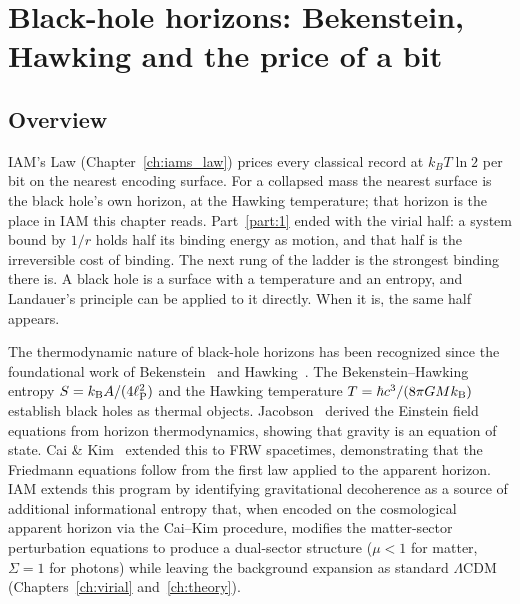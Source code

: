 
\chapter{Black-hole horizons: Bekenstein, Hawking and the price of a bit}\label{ch:blackholes}

\section*{Overview}
IAM's Law (Chapter~\ref{ch:iams_law}) prices every classical record at $k_BT\ln2$ per bit on the nearest encoding surface. For a collapsed
mass the nearest surface is the black hole's own horizon, at the Hawking temperature; that horizon is the place in IAM this chapter reads.
Part~\ref{part:1} ended with the virial half: a system bound by $1/r$ holds half its binding energy as motion, and that half is the irreversible cost of binding. The
next rung of the ladder is the strongest binding there is. A black hole is a surface with a temperature and an entropy, and Landauer's principle can be
applied to it directly. When it is, the same half appears.

The thermodynamic nature of black-hole horizons has been recognized since the foundational work of Bekenstein~\cite{Bekenstein1973} and Hawking~\cite{Hawking1975}. The
Bekenstein--Hawking entropy $S=k_{\mathrm B} A/(4\ell_{\mathrm P}^2)$ and the Hawking temperature $T=\hbar c^3/(8\pi GMk_{\mathrm B})$ establish black holes as thermal objects.
Jacobson~\cite{Jacobson1995} derived the Einstein field equations from horizon thermodynamics, showing that gravity is an equation of state. Cai \& Kim~\cite{CaiKim2005}
extended this to FRW spacetimes, demonstrating that the Friedmann equations follow from the first law applied to the apparent horizon. IAM extends this
program by identifying gravitational decoherence as a source of additional informational entropy that, when encoded on the cosmological apparent horizon
via the Cai--Kim procedure, modifies the matter-sector perturbation equations to produce a dual-sector structure ($\mu<1$ for matter, $\Sigma=1$ for photons)
while leaving the background expansion as standard $\Lambda$CDM (Chapters~\ref{ch:virial} and~\ref{ch:theory}).

